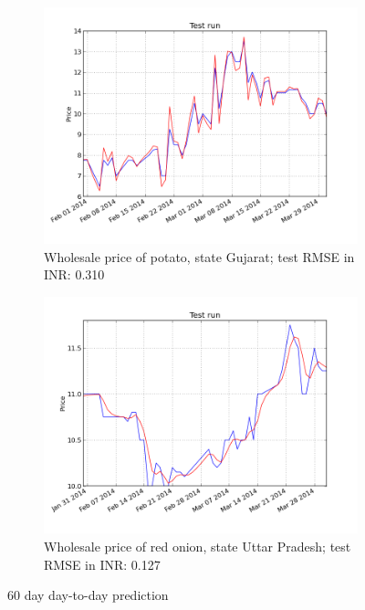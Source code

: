 \begin{figure}[!ht]
    \centering
        \begin{subfigure}[b]{.45\textwidth}
        \centering
        \includegraphics[width=\textwidth]{./img/plots/esn/daily/gujarat_potato_online_60d_1d.png}
        \caption{Wholesale price of potato, state Gujarat; test RMSE in INR: 0.310}
        \label{subfig:res_60d_1}
        \end{subfigure}
        \quad
        \begin{subfigure}[b]{.45\textwidth}
        \centering
        \includegraphics[width=\textwidth]{./img/plots/esn/daily/uttar_pradesh_redonion_60d_1d.png}
        \caption{Wholesale price of red onion, state Uttar Pradesh; test RMSE in INR: 0.127}
        \label{subfig:res_60d_2}
        \end{subfigure}

    \caption{60 day day-to-day prediction}
    \label{fig:res_60d}
\end{figure}

